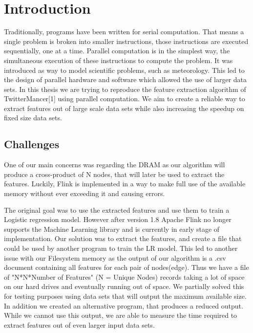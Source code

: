 \chapter{Introduction}


Traditionally, programs have been written for serial computation. That means a single problem is broken into smaller instructions, those instructions are executed sequentially, one at a time. Parallel computation is in the simplest way, the simultaneous execution of these instructions to compute the problem. It was introduced as way to model scientific problems, such as meteorology. This led to the design of parallel hardware and software which allowed the use of larger data sets. In this thesis we are trying to reproduce the feature extraction algorithm of TwitterMancer[1] using parallel computation. We aim to create a reliable way to extract features out of large scale data sets while also increasing the speedup on fixed size data sets.


\section{Challenges}


One of our main concerns was regarding the DRAM as our algorithm will produce a cross-product of N nodes, that will later be used to extract the features. Luckily, Flink is implemented in a way to make full use of the available memory without ever exceeding it and causing errors. 

The original goal was to use the extracted features and use them to train a Logistic regression model. However after version 1.8 Apache Flink no longer supports the Machine Learning library and is currently in early stage of implementation. Our solution was to extract the features, and create a file that could be used by another program to train the LR model. This led to another issue with our Filesystem memory as the output of our algorithm is a .csv document containing all features for each pair of nodes(edge). Thus we have a file of "N*N*Number of Features" (N = Unique Nodes) records taking a lot of space on our hard drives and eventually running out of space. We partially solved this for testing purposes using data sets that will output the maximum available size. In addition we created an alternative program, that produces a reduced output. While we cannot use this output, we are able to measure the time required to extract features out of even larger input data sets.

